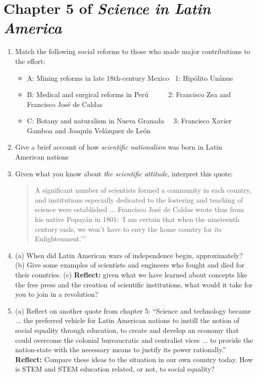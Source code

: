 \documentclass[12pt]{article}
\begin{document}
\maketitle
\small

\section{Chapter 5 of \textit{Science in Latin America}}

\begin{enumerate}
\item Match the following social reforms to those who made major contributions to the effort:
\footnotesize
\begin{itemize}
\item A: Mining reforms in late 18th-century Mexico$~~~~$1: Hip\'{o}lito Un\'{a}nue 
\item B: Medical and surgical reforms in Per\'{u}$~~~~~~~~~~~~~$2: Francisco Zea and Francisco Jos\'{e} de Caldas
\item C: Botany and naturalism in Nueva Granada$~~~~~~$3: Francisco Xavier Gamboa and Joaqu\'{i}n Vel\'{a}zquez de Le\'{o}n
\end{itemize}
\small
\item Give a brief account of how \textit{scientific nationalism} was born in Latin American nations \\ \vspace{1cm}
\item Given what you know about \textit{the scientific attitude}, interpret this quote:
\begin{quote}
A significant number of scientists formed a community in each country, and institutions especially dedicated to the fostering and teaching of science were established ... Francisco Jos\'{e} de Caldas wrote thus from his native Popay\'{a}n in 1801: `I am certain that when the nineteenth century ends, we won't have to envy the home country for its Enlightenment.'''
\end{quote} \vspace{1cm}
\item (a) When did Latin American wars of independence begin, approximately? (b) Give some examples of scientists and engineers who fought and died for their countries. (c) \textbf{Reflect:} given what we have learned about concepts like the free press and the creation of scientific institutions, what would it take for you to join in a revolution? \\ \vspace{1cm}
\item (a) Reflect on another quote from chapter 5: ``Science and technology became ... the preferred vehicle for Latin American nations to instill the notion of social equality through education, to create and develop an economy that could overcome the colonial bureaucratic and centralist vices ... to provide the nation-state with the necessary means to justify its power rationally.'' \textbf{Reflect:} Compare these ideas to the situation in our own country today.  How is STEM and STEM education related, or not, to social equality?
\end{enumerate}
\end{document}
